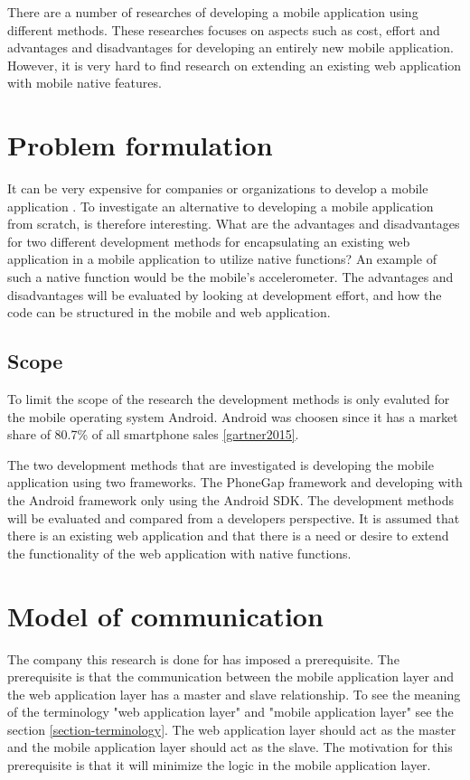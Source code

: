 There are a number of researches of developing a mobile application using different methods. These researches focuses on aspects such as cost, effort and advantages and disadvantages for developing an entirely new mobile application. However, it is very hard to find research on extending an existing web application with mobile native features.

\section{Problem formulation}\label{sec:problem-formulation}
It can be very expensive for companies or organizations to develop a mobile application \cite{kohan2015}. To investigate an alternative to developing a mobile application from scratch, is therefore interesting.
What are the advantages and disadvantages for two different development methods for encapsulating an existing web application in a mobile application to utilize native functions? An example of such a native function would be the mobile's accelerometer. The advantages and disadvantages will be evaluated by looking at development effort, and how the code can be structured in the mobile and web application. 

\subsection{Scope} \label{subsec:scope}
To limit the scope of the research the development methods is only evaluted for the mobile operating system Android. Android was choosen since it has a market share of 80.7\% of all smartphone sales \ref{gartner2015}.

The two development methods that are investigated is developing the mobile application using two frameworks. The PhoneGap framework and developing with the Android framework only using the Android SDK. The development methods will be evaluated and compared from a developers perspective. It is assumed that there is an existing web application and that there is a need or desire to extend the functionality of the web application with native functions.

\section{Model of communication}\label{sec:model-of-communication}
The company this research is done for has imposed a prerequisite. The prerequisite is that the communication between the mobile application layer and the web application layer has a master and slave relationship. To see the meaning of the terminology "web application layer" and "mobile application layer" see the section \ref{section-terminology}. The web application layer should act as the master and the mobile application layer should act as the slave. The motivation for this prerequisite is that it will minimize the logic in the mobile application layer. 

